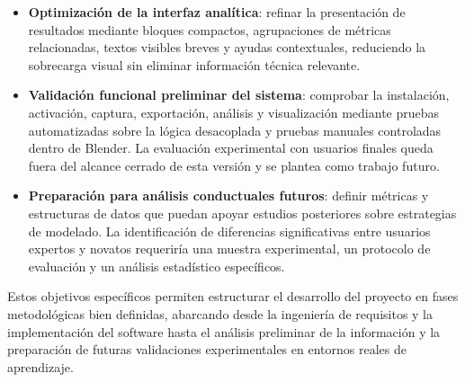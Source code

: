 \begin{itemize}
\item \textbf{Optimización de la interfaz analítica}: refinar la presentación de resultados mediante bloques compactos, agrupaciones de métricas relacionadas, textos visibles breves y ayudas contextuales, reduciendo la sobrecarga visual sin eliminar información técnica relevante.

\item \textbf{Validación funcional preliminar del sistema}: comprobar la instalación, activación, captura, exportación, análisis y visualización mediante pruebas automatizadas sobre la lógica desacoplada y pruebas manuales controladas dentro de Blender. La evaluación experimental con usuarios finales queda fuera del alcance cerrado de esta versión y se plantea como trabajo futuro.

\item \textbf{Preparación para análisis conductuales futuros}: definir métricas y estructuras de datos que puedan apoyar estudios posteriores sobre estrategias de modelado. La identificación de diferencias significativas entre usuarios expertos y novatos requeriría una muestra experimental, un protocolo de evaluación y un análisis estadístico específicos.

\end{itemize}

Estos objetivos específicos permiten estructurar el desarrollo del proyecto en fases metodológicas bien definidas, abarcando desde la ingeniería de requisitos y la implementación del software hasta el análisis preliminar de la información y la preparación de futuras validaciones experimentales en entornos reales de aprendizaje.